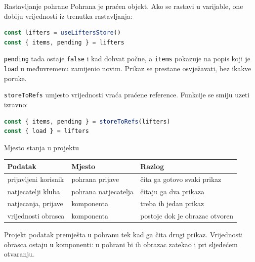 \begin{frame}[fragile]{Rastavljanje pohrane}
Pohrana je praćen objekt. Ako se rastavi u varijable, one dobiju vrijednosti iz trenutka rastavljanja:

\begin{lstlisting}[language=typescript]
const lifters = useLiftersStore()
const { items, pending } = lifters
\end{lstlisting}

\vspace{0.3em}
\texttt{pending} tada ostaje \texttt{false} i kad dohvat počne, a \texttt{items} pokazuje na popis koji je \texttt{load} u međuvremenu zamijenio novim. Prikaz se prestane osvježavati, bez ikakve poruke.

\vspace{0.3em}
\texttt{storeToRefs} umjesto vrijednosti vraća praćene reference. Funkcije se smiju uzeti izravno:

\begin{lstlisting}[language=typescript]
const { items, pending } = storeToRefs(lifters)
const { load } = lifters
\end{lstlisting}
\end{frame}

\begin{frame}{Mjesto stanja u projektu}
\vspace{0.3em}
\begin{center}
{\small
\setlength{\tabcolsep}{5pt}
\renewcommand{\arraystretch}{1.35}
\begin{tabular}{@{}L{3.3cm}L{3.3cm}L{5.4cm}@{}}
  \toprule
  \textbf{Podatak} & \textbf{Mjesto} & \textbf{Razlog} \\
  \midrule
  prijavljeni korisnik & pohrana prijave & čita ga gotovo svaki prikaz \\
  natjecatelji kluba & pohrana natjecatelja & čitaju ga dva prikaza \\
  natjecanja, prijave & komponenta & treba ih jedan prikaz \\
  vrijednosti obrasca & komponenta & postoje dok je obrazac otvoren \\
  \bottomrule
\end{tabular}
}
\end{center}

\vspace{0.7em}
\begin{konvencija}
Projekt podatak premješta u pohranu tek kad ga čita drugi prikaz. Vrijednosti obrasca ostaju u komponenti: u pohrani bi ih obrazac zatekao i pri sljedećem otvaranju.
\end{konvencija}
\end{frame}

